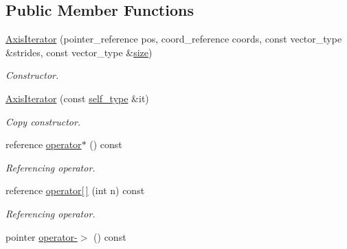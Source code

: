\subsection*{Public Member Functions}
\begin{DoxyCompactItemize}
\item 
\hypertarget{class_d_o_1_1_axis_iterator_abfc20ae4f3e395a95f0aeb868272fc45}{\hyperlink{class_d_o_1_1_axis_iterator_abfc20ae4f3e395a95f0aeb868272fc45}{Axis\-Iterator} (pointer\-\_\-reference pos, coord\-\_\-reference coords, const vector\-\_\-type \&strides, const vector\-\_\-type \&\hyperlink{class_d_o_1_1_axis_iterator_ab8e4e3e2a7bf18888b71bdf9dda0770b}{size})}\label{class_d_o_1_1_axis_iterator_abfc20ae4f3e395a95f0aeb868272fc45}

\begin{DoxyCompactList}\small\item\em Constructor. \end{DoxyCompactList}\item 
\hypertarget{class_d_o_1_1_axis_iterator_a94cc353f1334b1d367d4df72ceb61071}{\hyperlink{class_d_o_1_1_axis_iterator_a94cc353f1334b1d367d4df72ceb61071}{Axis\-Iterator} (const \hyperlink{class_d_o_1_1_axis_iterator}{self\-\_\-type} \&it)}\label{class_d_o_1_1_axis_iterator_a94cc353f1334b1d367d4df72ceb61071}

\begin{DoxyCompactList}\small\item\em Copy constructor. \end{DoxyCompactList}\item 
\hypertarget{class_d_o_1_1_axis_iterator_aa149c2249879e7727f33688b76bf2c99}{reference \hyperlink{class_d_o_1_1_axis_iterator_aa149c2249879e7727f33688b76bf2c99}{operator$\ast$} () const }\label{class_d_o_1_1_axis_iterator_aa149c2249879e7727f33688b76bf2c99}

\begin{DoxyCompactList}\small\item\em Referencing operator. \end{DoxyCompactList}\item 
\hypertarget{class_d_o_1_1_axis_iterator_a32d919fd1ac974efa89582486e7752de}{reference \hyperlink{class_d_o_1_1_axis_iterator_a32d919fd1ac974efa89582486e7752de}{operator\mbox{[}$\,$\mbox{]}} (int n) const }\label{class_d_o_1_1_axis_iterator_a32d919fd1ac974efa89582486e7752de}

\begin{DoxyCompactList}\small\item\em Referencing operator. \end{DoxyCompactList}\item 
\hypertarget{class_d_o_1_1_axis_iterator_a33ce448509e9cc0d73861e4c1919c7a7}{pointer \hyperlink{class_d_o_1_1_axis_iterator_a33ce448509e9cc0d73861e4c1919c7a7}{operator-\/$>$} () const }\label{class_d_o_1_1_axis_iterator_a33ce448509e9cc0d73861e4c1919c7a7}


\end{DoxyCompactItemize}
